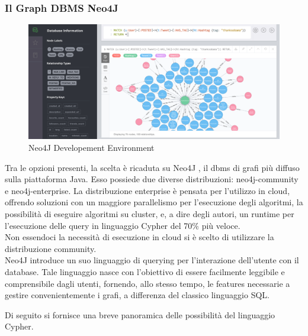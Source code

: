 \documentclass[a4paper, 12pt]{article}
\begin{document}
\subsubsection{Il Graph DBMS Neo4J}
\begin{figure}[H]
  \includegraphics[width=\linewidth]{images/neo4j.png}
  \caption{Neo4J Developement Environment}
\end{figure}
Tra le opzioni presenti, la scelta è ricaduta su Neo4J \cite{neo4j}, il dbms di grafi più diffuso sulla piattaforma Java. Esso possiede due diverse distribuzioni: neo4j-community e neo4j-enterprise. La distribuzione enterprise è pensata per l'utilizzo in cloud, offrendo soluzioni con un maggiore parallelismo per l'esecuzione degli algoritmi, la possibilità di eseguire algoritmi su cluster, e, a dire degli autori, un runtime per l'esecuzione delle query in linguaggio Cypher del 70\% più veloce. \\
Non essendoci la necessità di esecuzione in cloud si è scelto di utilizzare la distribuzione community. \\
Neo4J introduce un suo linguaggio di querying per l'interazione dell'utente con il database. Tale linguaggio nasce con l'obiettivo di essere facilmente leggibile e comprensibile dagli utenti, fornendo, allo stesso tempo, le features necessarie a gestire convenientemente i grafi, a differenza del classico linguaggio SQL.
\par
Di seguito si fornisce una breve panoramica delle possibilità del linguaggio Cypher.
\end{document}
